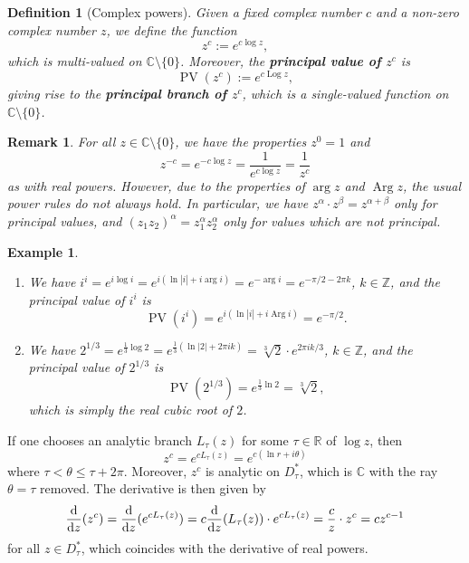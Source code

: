 \documentclass[10pt]{article}
\newcommand{\R}{\mathbb{R}}
\newcommand{\C}{\mathbb{C}}
\newcommand{\Z}{\mathbb{Z}}
\newcommand{\ddz}{\frac{\rm d}{{\rm d}z}}
\DeclareMathOperator{\Arg}{Arg}
\DeclareMathOperator{\Log}{Log}
\DeclareMathOperator{\PV}{PV}
\theoremstyle{newstyle}
\newtheorem{remark}[thm]{Remark}
\newtheorem{defn}[thm]{Definition}
\newtheorem{exmp}[thm]{Example}
\begin{document}
\begin{defn}[Complex powers]
Given a fixed complex number $c$ and a non-zero complex number $z$, we define the function
\[ z^c := e^{c\log z}, \]
which is multi-valued on $\C \setminus \{0\}$. Moreover, the {\bf principal value 
of $z^c$} is 
\[ \PV(z^c) := e^{c\Log z}, \]
giving rise to the {\bf principal branch of $z^c$}, which is a single-valued function on $\C \setminus \{0\}$. 
\end{defn}

\begin{remark}
For all $z \in \C \setminus \{0\}$, we have the properties $z^0 = 1$ and 
\[ z^{-c} = e^{-c\log z} = \frac{1}{e^{c\log z}} = \frac{1}{z^c} \]
as with real powers. However, due to the properties of $\arg z$ and $\Arg z$, the usual power 
rules do not always hold. In particular, we have $z^\alpha \cdot z^\beta = 
z^{\alpha+\beta}$ only for principal values, and $(z_1 z_2)^\alpha 
= z_1^\alpha z_2^\alpha$ only for values which are not principal.
\end{remark}

\begin{exmp}~
\begin{enumerate}[(1)]
    \item We have $i^i = e^{i\log i} = e^{i(\ln|i| + i\arg i)} = e^{-\arg i} 
    = e^{-\pi/2 - 2\pi k}$, $k \in \Z$, and the principal value of $i^i$ is 
    \[ \PV(i^i) = e^{i(\ln|i| + i\Arg i)} = e^{-\pi/2}. \]
    \item We have $2^{1/3} = e^{\frac13\log 2} = e^{\frac13(\ln|2| + 2\pi ik)} = \sqrt[3]{2} \cdot  
    e^{2\pi ik/3}$, $k \in \Z$, and the principal value of $2^{1/3}$ is 
    \[ \PV(2^{1/3}) = e^{\frac13 \ln 2} = \sqrt[3]{2}, \]
    which is simply the real cubic root of $2$. 
\end{enumerate}
\end{exmp}

If one chooses an analytic branch $L_\tau(z)$ for some $\tau \in \R$ of $\log z$, then 
\[ z^c = e^{cL_\tau(z)} = e^{c(\ln r + i\theta)} \]
where $\tau < \theta \leq \tau + 2\pi$. Moreover, $z^c$ is analytic on $D_\tau^*$, which is 
$\C$ with the ray $\theta = \tau$ removed. The derivative is then given by 
\[ \ddz(z^c) = \ddz(e^{cL_\tau(z)}) = c \ddz(L_\tau(z)) \cdot e^{cL_\tau(z)} = 
\frac cz \cdot z^c = cz^{c-1} \]
for all $z \in D_\tau^*$, which coincides with the derivative of real powers. 
\end{document}
